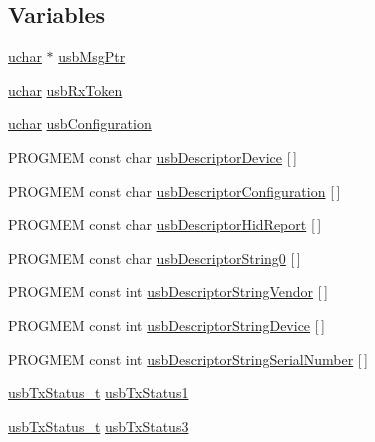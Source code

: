 \subsection*{Variables}
\begin{DoxyCompactItemize}
\item 
\hyperlink{mhvlib-_vusb-_console_2vusb_2usbdrv_8h_aa8ddf20cdd716b652e76e23e5e700893}{uchar} $\ast$ \hyperlink{mhvlib-_vusb-_console_2vusb_2usbdrv_8h_a5f78c8584830588b8c0c8f2a27772f8e}{usb\-Msg\-Ptr}
\item 
\hyperlink{mhvlib-_vusb-_console_2vusb_2usbdrv_8h_aa8ddf20cdd716b652e76e23e5e700893}{uchar} \hyperlink{mhvlib-_vusb-_console_2vusb_2usbdrv_8h_ae2a9422baba7da8914129e0784ab2c05}{usb\-Rx\-Token}
\item 
\hyperlink{mhvlib-_vusb-_console_2vusb_2usbdrv_8h_aa8ddf20cdd716b652e76e23e5e700893}{uchar} \hyperlink{mhvlib-_vusb-_console_2vusb_2usbdrv_8h_aa43502fd98afab29fcd5115c1f2c4067}{usb\-Configuration}
\item 
P\-R\-O\-G\-M\-E\-M const char \hyperlink{mhvlib-_vusb-_console_2vusb_2usbdrv_8h_a1b8593e30029ecfd59a89335a12db631}{usb\-Descriptor\-Device} \mbox{[}$\,$\mbox{]}
\item 
P\-R\-O\-G\-M\-E\-M const char \hyperlink{mhvlib-_vusb-_console_2vusb_2usbdrv_8h_a9a566690103d3a34df4893e7c0d3bf10}{usb\-Descriptor\-Configuration} \mbox{[}$\,$\mbox{]}
\item 
P\-R\-O\-G\-M\-E\-M const char \hyperlink{mhvlib-_vusb-_console_2vusb_2usbdrv_8h_a66e1ec15fd4a4458927902d3764179af}{usb\-Descriptor\-Hid\-Report} \mbox{[}$\,$\mbox{]}
\item 
P\-R\-O\-G\-M\-E\-M const char \hyperlink{mhvlib-_vusb-_console_2vusb_2usbdrv_8h_a367afe22c903b4b58805cc451c22cb99}{usb\-Descriptor\-String0} \mbox{[}$\,$\mbox{]}
\item 
P\-R\-O\-G\-M\-E\-M const int \hyperlink{mhvlib-_vusb-_console_2vusb_2usbdrv_8h_aa92b0dfd57d302ff023bfb7ed868c2a1}{usb\-Descriptor\-String\-Vendor} \mbox{[}$\,$\mbox{]}
\item 
P\-R\-O\-G\-M\-E\-M const int \hyperlink{mhvlib-_vusb-_console_2vusb_2usbdrv_8h_a1f252008bbf46a3172ebf8a4f8213a60}{usb\-Descriptor\-String\-Device} \mbox{[}$\,$\mbox{]}
\item 
P\-R\-O\-G\-M\-E\-M const int \hyperlink{mhvlib-_vusb-_console_2vusb_2usbdrv_8h_a97aa1ed300e711b6eabb5cef561313a3}{usb\-Descriptor\-String\-Serial\-Number} \mbox{[}$\,$\mbox{]}
\item 
\hyperlink{mhvlib-_vusb-_keyboard_2vusb_2usbdrv_8h_ae6a25e02d49899e1862aa987a6c09ade}{usb\-Tx\-Status\-\_\-t} \hyperlink{mhvlib-_vusb-_console_2vusb_2usbdrv_8h_a8787d5ad73afd0d305818dfbdce2bc85}{usb\-Tx\-Status1}
\item 
\hyperlink{mhvlib-_vusb-_keyboard_2vusb_2usbdrv_8h_ae6a25e02d49899e1862aa987a6c09ade}{usb\-Tx\-Status\-\_\-t} \hyperlink{mhvlib-_vusb-_console_2vusb_2usbdrv_8h_a59db875c71a09a29e967500bdbfce4e0}{usb\-Tx\-Status3}
\end{DoxyCompactItemize}


